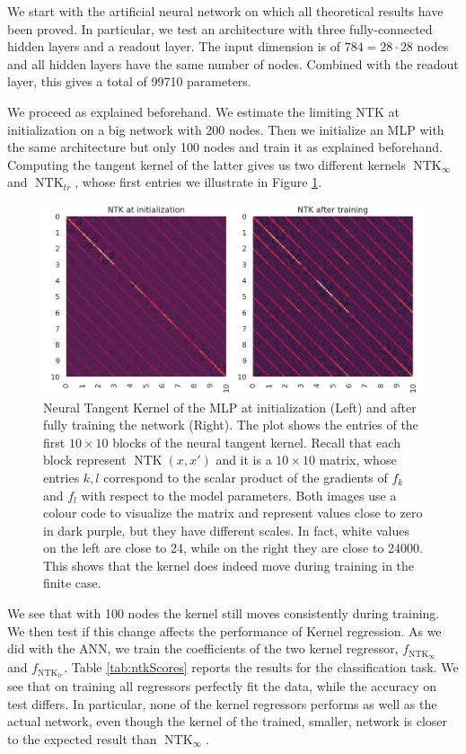 \documentclass[11pt,notitlepage]{article}
\numberwithin{equation}{section}
\DeclareMathOperator{\NTK}{NTK}
\theoremstyle{remark}
\theoremstyle{definition}
\begin{document}
	We start with the artificial neural network on which all theoretical results have been proved.
	In particular, we test an architecture with three fully-connected hidden layers and a readout layer.
	The input dimension is of $784 = 28 \cdot 28$ nodes and all hidden layers have the same number of nodes.
	Combined with the readout layer, this gives a total of 99710 parameters.
	
	We proceed as explained beforehand.
	We estimate the limiting NTK at initialization on a big network with 200 nodes.
	Then we initialize an MLP with the same architecture but only 100 nodes and train it as explained beforehand.
	Computing the tangent kernel of the latter gives us two different kernels $\NTK_\infty$ and $\NTK_{tr}$, whose first entries we illustrate in Figure \ref{fig:ntk_before_after_tr}.
	\begin{figure}
		\includegraphics[width=\linewidth]{../Simulations/figures/ntk_before_after_tr.png}
		\caption{Neural Tangent Kernel of the MLP at initialization (Left) and after fully training the network (Right).
			The plot shows the entries of the first $10 \times 10$ blocks of the neural tangent kernel.
			Recall that each block represent $\NTK(x, x')$ and it is a $10 \times 10$ matrix, whose entries $k,l$ correspond to the scalar product of the gradients of $f_k$ and $f_l$ with respect to the model parameters. 
			Both images use a colour code to visualize the matrix and represent values close to zero in dark purple, but they have different scales.
			In fact, white values on the left are close to 24, while on the right they are close to 24000.
			This shows that the kernel does indeed move during training in the finite case.}
		\label{fig:ntk_before_after_tr}        
	\end{figure}
	
	We see that with 100 nodes the kernel still moves consistently during training.
	We then test if this change affects the performance of Kernel regression.
	As we did with the ANN, we train the coefficients of the two kernel regressor, $f_{\NTK_\infty}$ and $f_{\NTK_{tr}}$.
	Table \ref{tab:ntkScores} reports the results for the classification task.
	We see that on training all regressors perfectly fit the data, while the accuracy on test differs.
	In particular, none of the kernel regressors performs as well as the actual network, even though the kernel of the trained, smaller, network is closer to the expected result than $\NTK_\infty$.
	
\end{document}
